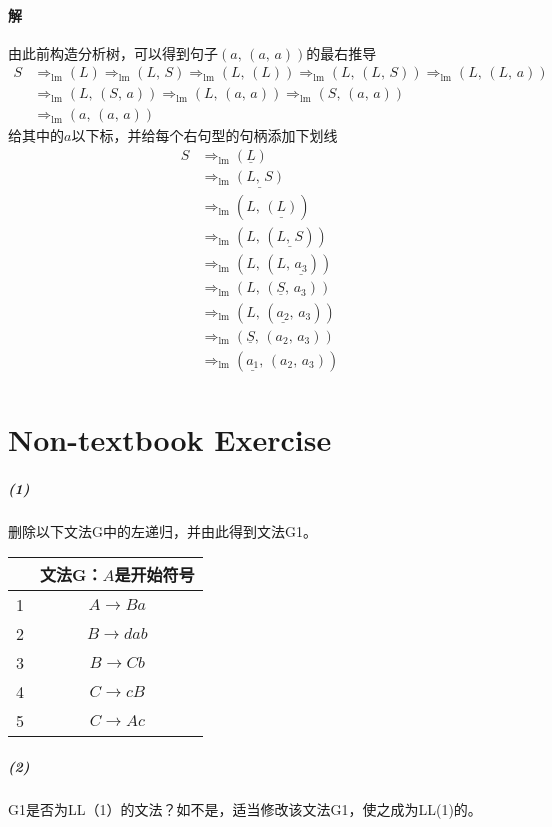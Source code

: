 \documentclass{article}
\begin{document}
\paragraph{解}
由此前构造分析树，可以得到句子$(a,\,(a,\,a))$的最右推导
\begin{align*}
    S &\Rightarrow_{\text{lm}} (L) \Rightarrow_{\text{lm}} (L,\,S) \Rightarrow_{\text{lm}} (L,\,(L)) \Rightarrow_{\text{lm}} (L,\,(L,\,S)) \Rightarrow_{\text{lm}} (L,\,(L,\,a)) \\
    &\Rightarrow_{\text{lm}} (L,\,(S,\,a))
    \Rightarrow_{\text{lm}} (L,\,(a,\,a)) \Rightarrow_{\text{lm}} (S,\,(a,\,a)) \\
    &\Rightarrow_{\text{lm}} (a,\,(a,\,a))
\end{align*}
给其中的$a$以下标，并给每个右句型的句柄添加下划线
\begin{align*}
    S &\Rightarrow_{\text{lm}} (\underline{L}) \\
    &\Rightarrow_{\text{lm}} \underline{(L,\,S)} \\
    &\Rightarrow_{\text{lm}} (L,\,\underline{(L)}) \\
    &\Rightarrow_{\text{lm}} (L,\,(\underline{L,\,S})) \\
    &\Rightarrow_{\text{lm}} (L,\,(L,\,\underline{a_3})) \\
    &\Rightarrow_{\text{lm}} (L,\,(\underline{S},\,a_3)) \\
    &\Rightarrow_{\text{lm}} (L,\,(\underline{a_2},\,a_3)) \\
    &\Rightarrow_{\text{lm}} (\underline{S},\,(a_2,\,a_3)) \\
    &\Rightarrow_{\text{lm}} (\underline{a_1},\,(a_2,\,a_3)) \\
\end{align*}

\section{Non-textbook Exercise}
\subparagraph{(1)}
删除以下文法G中的左递归，并由此得到文法G1。
\begin{table}[H]
    \centering
    \begin{tabular}{|c|c|}
        \hline
        & 文法G：$A$是开始符号 \\ \hline
        1 & $A \rightarrow Ba$ \\ \hline
        2 & $B \rightarrow dab$ \\ \hline
        3 & $B \rightarrow Cb$ \\ \hline
        4 & $C \rightarrow cB$ \\ \hline
        5 & $C \rightarrow Ac$ \\ \hline
    \end{tabular}
\end{table}
\subparagraph{(2)}
G1是否为LL（1）的文法？如不是，适当修改该文法G1，使之成为LL(1)的。
\end{document}
